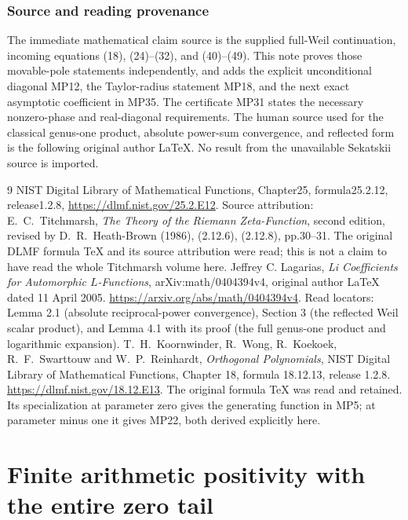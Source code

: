 \documentclass[11pt]{article}
\begin{document}
\section*{Source and reading provenance}
The immediate mathematical claim source is the supplied full-Weil
continuation, incoming equations (18), (24)--(32), and (40)--(49).
This note proves those movable-pole statements independently, and adds
the explicit unconditional diagonal MP12, the Taylor-radius statement
MP18, and the next exact asymptotic coefficient in MP35. The certificate
MP31 states the necessary nonzero-phase and real-diagonal requirements.
The human source used for the classical genus-one product, absolute
power-sum convergence, and reflected form is the following original
author LaTeX. No result from the unavailable Sekatskii source is imported.

\begin{thebibliography}{9}
NIST Digital Library of Mathematical Functions, Chapter25,
formula25.2.12, release1.2.8,
\url{https://dlmf.nist.gov/25.2.E12}.
Source attribution: E.~C.~Titchmarsh,
\emph{The Theory of the Riemann Zeta-Function}, second edition,
revised by D.~R.~Heath-Brown (1986), (2.12.6), (2.12.8), pp.30--31.
The original DLMF formula TeX and its source attribution were read;
this is not a claim to have read the whole Titchmarsh volume here.
Jeffrey C. Lagarias,
\emph{Li Coefficients for Automorphic $L$-Functions},
arXiv:math/0404394v4, original author LaTeX dated 11 April 2005.
\url{https://arxiv.org/abs/math/0404394v4}.
Read locators: Lemma 2.1 (absolute reciprocal-power convergence),
Section 3 (the reflected Weil scalar product), and Lemma 4.1 with its
proof (the full genus-one product and logarithmic expansion).
T.~H.~Koornwinder, R.~Wong, R.~Koekoek, R.~F.~Swarttouw and
W.~P.~Reinhardt, \emph{Orthogonal Polynomials}, NIST Digital
Library of Mathematical Functions, Chapter 18, formula 18.12.13,
release 1.2.8. \url{https://dlmf.nist.gov/18.12.E13}.
The original formula TeX was read and retained. Its specialization
at parameter zero gives the generating function in MP5; at
parameter minus one it gives MP22, both derived explicitly here.
\end{thebibliography}

\endgroup

\clearpage\begingroup
\part*{Finite arithmetic positivity with the entire zero tail}
\newcommand{\swcertW}{\mathcal W}
\newcommand{\swcertC}{\mathbb C}
\newcommand{\swcertR}{\mathbb R}
\newcommand{\swcertdiag}{\operatorname{diag}}
\end{document}
